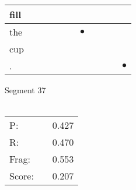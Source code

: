 \documentclass[landscape]{article}
\newcommand{\ssp}{\hspace{2pt}}
\newcommand{\mex}{\cellcolor{g}$\bullet$}
\begin{document}
\begin{tabular}{|l|p{10pt}|p{10pt}|p{10pt}|p{10pt}|p{10pt}|p{10pt}|p{10pt}|p{10pt}|p{10pt}|p{10pt}|}
\hline
\ssp fill \ssp&\hspace{2pt}&\hspace{2pt}&\hspace{2pt}&\hspace{2pt}&\hspace{2pt}&\hspace{2pt}&\hspace{2pt}&\hspace{2pt}&\hspace{2pt}&\hspace{2pt}\\
\hline
\ssp \cellcolor{ref5}the \ssp&\hspace{2pt}&\hspace{2pt}&\hspace{2pt}&\hspace{2pt}&\hspace{2pt}&\hspace{2pt}\mex&\hspace{2pt}&\hspace{2pt}&\hspace{2pt}&\hspace{2pt}\\
\hline
\ssp cup \ssp&\hspace{2pt}&\hspace{2pt}&\hspace{2pt}&\hspace{2pt}&\hspace{2pt}&\hspace{2pt}&\hspace{2pt}&\hspace{2pt}&\hspace{2pt}&\hspace{2pt}\\
\hline
\ssp \cellcolor{ref9}. \ssp&\hspace{2pt}&\hspace{2pt}&\hspace{2pt}&\hspace{2pt}&\hspace{2pt}&\hspace{2pt}&\hspace{2pt}&\hspace{2pt}&\hspace{2pt}&\hspace{2pt}\mex\\
\hline
\end{tabular}

\vspace{6pt}
\noindent Segment 37\\\\
\noindent\begin{tabular}{lm{12pt}r}
\hline
P:&&0.427\\
R:&&0.470\\
Frag:&&0.553\\
Score:&&0.207\\
\end{tabular}
\end{document}
